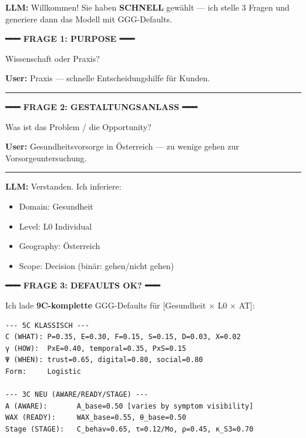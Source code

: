 \begin{tcolorbox}[colback=green!5!white, colframe=green!75!black,
    title=Example: SCHNELL Model Design (3 Questions), breakable]
\small
\textbf{LLM:} Willkommen! Sie haben \textbf{SCHNELL} gewählt --- ich stelle
3 Fragen und generiere dann das Modell mit GGG-Defaults.

\vspace{0.3em}
\textbf{━━━ FRAGE 1: PURPOSE ━━━}
\vspace{0.3em}

Wissenschaft oder Praxis?

\textbf{User:} Praxis --- schnelle Entscheidungshilfe für Kunden.

\hrule
\vspace{0.3em}

\textbf{━━━ FRAGE 2: GESTALTUNGSANLASS ━━━}
\vspace{0.3em}

Was ist das Problem / die Opportunity?

\textbf{User:} Gesundheitsvorsorge in Österreich --- zu wenige gehen zur
Vorsorgeuntersuchung.

\hrule
\vspace{0.3em}

\textbf{LLM:} Verstanden. Ich inferiere:
\begin{itemize}[nosep]
\item Domain: Gesundheit
\item Level: L0 Individual
\item Geography: Österreich
\item Scope: Decision (binär: gehen/nicht gehen)
\end{itemize}

\vspace{0.3em}
\textbf{━━━ FRAGE 3: DEFAULTS OK? ━━━}
\vspace{0.3em}

Ich lade \textbf{9C-komplette} GGG-Defaults für [Gesundheit × L0 × AT]:
\begin{verbatim}
--- 5C KLASSISCH ---
C (WHAT): P=0.35, E=0.30, F=0.15, S=0.15, D=0.03, X=0.02
γ (HOW):  PxE=0.40, temporal=0.35, PxS=0.15
Ψ (WHEN): trust=0.65, digital=0.80, social=0.80
Form:     Logistic

--- 3C NEU (AWARE/READY/STAGE) ---
A (AWARE):       A_base=0.50 [varies by symptom visibility]
WAX (READY):     WAX_base=0.55, θ_base=0.50
Stage (STAGE):   C_behav=0.65, τ=0.12/Mo, ρ=0.45, κ_S3=0.70
\end{verbatim}


\end{tcolorbox}
